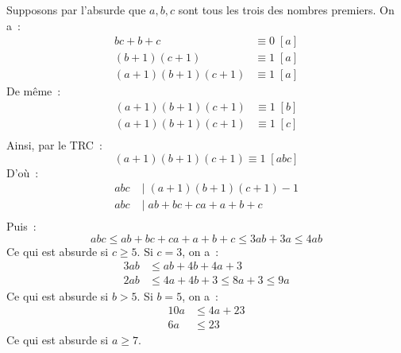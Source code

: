 \begin{sol}
Supposons par l'absurde que $a, b, c$ sont tous les trois des nombres premiers.
On a~:
\begin{align*}
bc + b + c &\equiv 0 \; [a] \\
(b + 1)(c + 1) &\equiv 1 \; [a] \\
(a + 1)(b + 1)(c + 1) &\equiv 1 \; [a]
\end{align*}
De même~:
\begin{align*}
  (a + 1)(b + 1)(c + 1) &\equiv 1 \; [b] \\
  (a + 1)(b + 1)(c + 1) &\equiv 1 \; [c] \\
\end{align*}
Ainsi, par le TRC~:
$$(a + 1)(b + 1)(c + 1) \equiv 1 \; [abc]$$
D'où~:
\begin{align*}
  abc &\;|\; (a + 1)(b + 1)(c + 1) - 1 \\
  abc &\;|\; ab + bc + ca + a + b + c \\
\end{align*}
Puis~:
$$abc \le ab + bc + ca + a + b + c \le 3ab + 3a \le 4ab$$
Ce qui est absurde si $c \ge 5$.
Si $c = 3$, on a~:
\begin{align*}
3ab &\le ab + 4b + 4a + 3 \\
2ab &\le 4a + 4b + 3 \le 8a + 3 \le 9a
\end{align*}
Ce qui est absurde si $b > 5$.
Si $b = 5$, on a~:
\begin{align*}
  10a &\le 4a + 23 \\
  6a &\le 23
\end{align*}
Ce qui est absurde si $a \ge 7$.
\end{sol}
